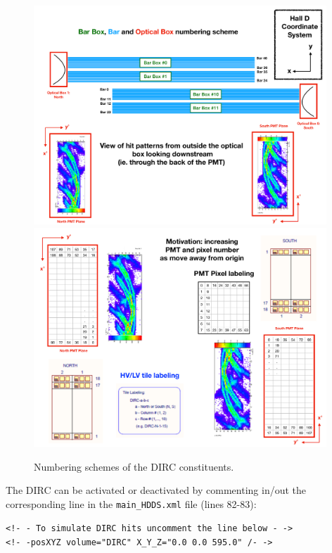 \begin{figure}[!h]
\centering
\includegraphics[width=0.98\textwidth]{pics/DIRC_Geometry11.pdf}\\
\includegraphics[width=0.98\textwidth]{pics/DIRC_Geometry22.pdf}
\caption{\label{pic:dircNumb}
Numbering schemes of the DIRC constituents.
}
\end{figure}

The DIRC can be activated or deactivated by commenting in/out the corresponding line in the \texttt{main{\_}HDDS.xml} file (lines 82-83): 

\vspace{0.5cm}
\begin{center}
 \texttt{<!- - To simulate DIRC hits uncomment the line below - -> \\
    <!- -posXYZ volume="DIRC" X{\_}Y{\_}Z="0.0 0.0 595.0" /- ->} 
\end{center}
\label{eq:line}
\vspace{0.5cm}

